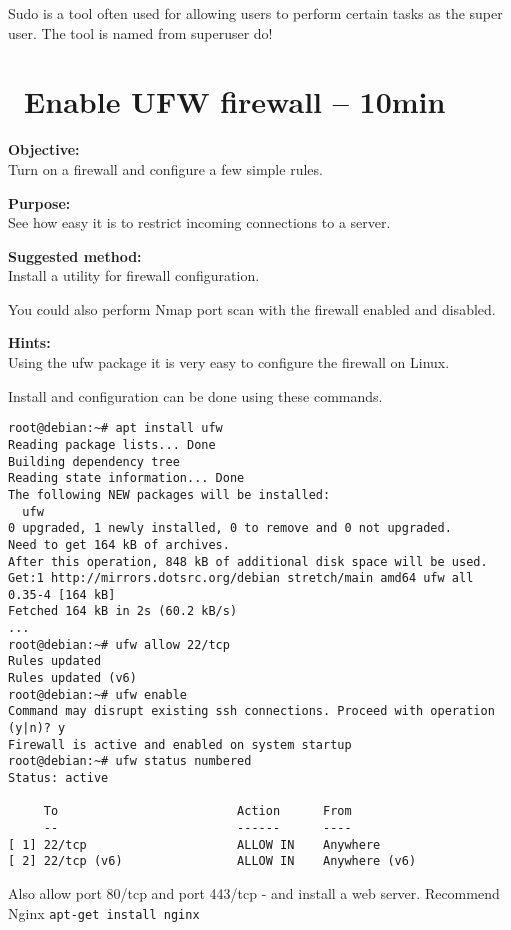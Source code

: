 \documentclass[a4paper,11pt,notitlepage]{report}
\begin{document}
Sudo is a tool often used for allowing users to perform certain tasks as the super user. The tool is named from superuser do! 


\chapter{\faExclamationTriangle\ Enable UFW firewall -- 10min}
\label{ex:debian-firewall}

{\bf Objective:}\\
Turn on a firewall and configure a few simple rules.

{\bf Purpose:}\\
See how easy it is to restrict incoming connections to a server.


{\bf Suggested method:}\\
Install a utility for firewall configuration.

You could also perform Nmap port scan with the firewall enabled and disabled.

{\bf Hints:}\\
Using the ufw package it is very easy to configure the firewall on Linux.

Install and configuration can be done using these commands.
\begin{verbatim}
root@debian:~# apt install ufw
Reading package lists... Done
Building dependency tree
Reading state information... Done
The following NEW packages will be installed:
  ufw
0 upgraded, 1 newly installed, 0 to remove and 0 not upgraded.
Need to get 164 kB of archives.
After this operation, 848 kB of additional disk space will be used.
Get:1 http://mirrors.dotsrc.org/debian stretch/main amd64 ufw all 0.35-4 [164 kB]
Fetched 164 kB in 2s (60.2 kB/s)
...
root@debian:~# ufw allow 22/tcp
Rules updated
Rules updated (v6)
root@debian:~# ufw enable
Command may disrupt existing ssh connections. Proceed with operation (y|n)? y
Firewall is active and enabled on system startup
root@debian:~# ufw status numbered
Status: active

     To                         Action      From
     --                         ------      ----
[ 1] 22/tcp                     ALLOW IN    Anywhere
[ 2] 22/tcp (v6)                ALLOW IN    Anywhere (v6)
\end{verbatim}

Also allow port 80/tcp and port 443/tcp - and install a web server. Recommend Nginx \verb+apt-get install nginx+
\end{document}
